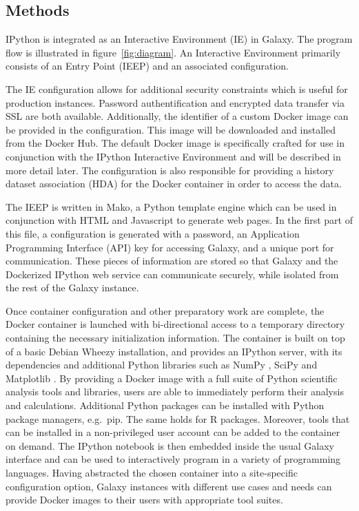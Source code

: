\documentclass{bioinfo}
\begin{document}
\begin{methods}
\section{Methods}

IPython is integrated as an Interactive Environment (IE) in Galaxy. The program flow is illustrated in 
figure~\ref{fig:diagram}. An Interactive Environment primarily consists of an Entry Point (IEEP) and an associated configuration.

The IE configuration allows for additional security constraints which is useful
for production instances. Password authentification and encrypted data transfer via SSL are both available.
Additionally, the identifier of a custom Docker image can be provided in the configuration. This image will be downloaded and 
installed from the Docker Hub. The default Docker image is specifically crafted for use in conjunction with the
IPython Interactive Environment and will be described in more detail later. 
The configuration is also responsible for providing a history dataset 
association (HDA) for the Docker container in order to access the data.

The IEEP is written in Mako, a Python template engine which can be used in conjunction with HTML
and Javascript to generate web pages. In the first part of this file, a configuration is generated with a password, 
an Application Programming Interface (API) key for accessing Galaxy, and a unique port for communication.
These pieces of information are stored so that Galaxy
and the Dockerized IPython web service can communicate securely, while isolated from the rest of the Galaxy instance.

Once container configuration and other preparatory work are complete, the Docker container is launched with bi-directional
access to a temporary directory containing the necessary initialization information. The container is built on top of a basic Debian Wheezy installation,
and provides an IPython server, with its dependencies and additional Python libraries such as NumPy \citep{Walt2011}, SciPy \citep{Jones2015} and Matplotlib \citep{Hunter2007}.
By providing a Docker image with a full suite of Python scientific analysis tools and libraries, users are able 
to immediately perform their analysis and calculations. Additional Python packages can be installed with Python
package managers, e.g.\ pip. The same holds for R packages. Moreover, tools that can be installed in a non-privileged user account can be added to the container on demand. 
The IPython notebook is then embedded inside the usual Galaxy interface and can be used to interactively program in a variety of programming languages.
Having abstracted the chosen container into a site-specific configuration option, Galaxy instances with different use cases
and needs can provide Docker images to their users with appropriate tool suites.


\end{methods}
\end{document}
